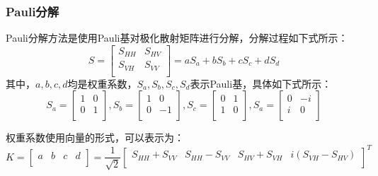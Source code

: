 \documentclass[promaster]{thesis-uestc}
\begin{document}
\subsubsection{Pauli分解}
Pauli分解方法是使用Pauli基对极化散射矩阵进行分解，分解过程如下式所示：
\begin{equation}
    S=\left[ \begin{matrix}
            S_{HH} & S_{HV} \\
            S_{VH} & S_{VV} \\
        \end{matrix} \right] =aS_a+bS_b+cS_c+dS_d
\end{equation}
其中，$a,b,c,d$均是权重系数，$S_a,S_b,S_c,S_d$表示Pauli基，具体如下式所示：
\begin{equation}
    S_a=\left[ \begin{matrix}
            1 & 0 \\
            0 & 1 \\
        \end{matrix} \right] ,S_b=\left[ \begin{matrix}
            1 & 0  \\
            0 & -1 \\
        \end{matrix} \right] ,S_c=\left[ \begin{matrix}
            0 & 1 \\
            1 & 0 \\
        \end{matrix} \right] ,S_a=\left[ \begin{matrix}
            0 & -i \\
            i & 0  \\
        \end{matrix} \right]
\end{equation}

权重系数使用向量的形式，可以表示为：
\begin{equation}
    K=\left[ \begin{matrix}
            a & b & c & d \\
        \end{matrix} \right] =\frac{1}{\sqrt{2}}\left[ \begin{matrix}
            S_{HH}+S_{VV} & S_{HH}-S_{VV} & S_{HV}+S_{VH} & i\left( S_{VH}-S_{HV} \right) \\
        \end{matrix} \right] ^T
\end{equation}
\end{document}
